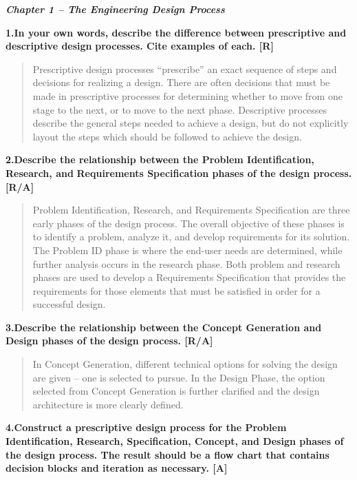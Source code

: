 \documentclass[
]{article}
\author{}
\date{}
\begin{document}
\emph{\textbf{Chapter 1 -- The Engineering Design Process}}

\textbf{1.In your own words, describe the difference between
prescriptive and descriptive design} \textbf{processes. Cite examples of
each. {[}R{]}}

\begin{quote}
Prescriptive design processes ``prescribe'' an exact sequence of steps
and decisions for realizing a design. There are often decisions that
must be made in prescriptive processes for determining whether to move
from one stage to the next, or to move to the next phase. Descriptive
processes describe the general steps needed to achieve a design, but do
not explicitly layout the steps which should be followed to achieve the
design.
\end{quote}

\textbf{2.Describe the relationship between the Problem Identification,
Research, and} \textbf{Requirements Specification phases of the design
process. {[}R/A{]}}

\begin{quote}
Problem Identification, Research, and Requirements Specification are
three early phases of the design process. The overall objective of these
phases is to identify a problem, analyze it, and develop requirements
for its solution. The Problem ID phase is where the end-user needs are
determined, while further analysis occurs in the research phase. Both
problem and research phases are used to develop a Requirements
Specification that provides the requirements for those elements that
must be satisfied in order for a successful design.
\end{quote}

\textbf{3.Describe the relationship between the Concept Generation and
Design phases of the} \textbf{design process. {[}R/A{]}}

\begin{quote}
In Concept Generation, different technical options for solving the
design are given -- one is selected to pursue. In the Design Phase, the
option selected from Concept Generation is further clarified and the
design architecture is more clearly defined.
\end{quote}

\textbf{4.Construct a prescriptive design process for the Problem
Identification, Research, Specification, Concept, and Design phases of
the design process. The result should be a flow chart that contains
decision blocks and iteration as necessary. {[}A{]}}
\end{document}
